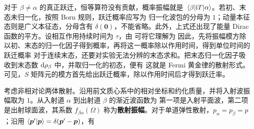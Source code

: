 对于 $\beta\ne\alpha$ 的真正跃迁，恒等算符没有贡献，概率振幅就是 $\mel{\beta}{\mathrm{i}T}{\alpha}$。若初、末态未归一化，按照 Born 规则，跃迁概率应写为
归一化波包的分母为 $1$；动量本征态则是广义本征态，分母含有 $\delta(\bm 0)$，不能省略。此外，上式还出现了能量 Dirac 函数的平方。设相互作用持续时间为 $\tau$，由
可将它理解为
因此，先将振幅模方除以初、末态的归一化因子得到概率，再将这一概率除以作用时间，得到单位时间的跃迁概率
对于连续末态，还要对实验无法分辨的末态求和。把末态归一化因子吸收到末态数 $\dd{\rho_\beta}$ 中，并取归一化的初态，便有
这就是 Fermi 黄金律的散射形式。可见，$S$ 矩阵元的模方首先给出跃迁概率，除以作用时间后才得到跃迁率。

考虑非相对论两体散射。沿用前文质心系中的相对坐标和约化质量，并将入射波振幅取为 $1$。从入射道 $\alpha$ 到出射道 $\beta$ 的渐近波函数为
第一项是入射平面波，第二项是出射球面波，其系数 $f_{\beta\alpha}(\Omega)$ 称为\textbf{散射振幅}。对于单道弹性散射，$p_\alpha=p_\beta=p$；沿用 $\ip{\bm p'}{\bm p}=\delta(\bm p'-\bm p)$，有

